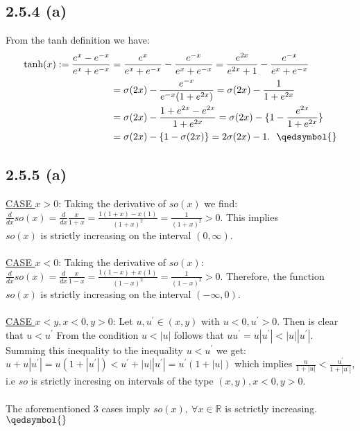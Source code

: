 \documentclass{exam}
\begin{document}
\subsection*{2.5.4 (a)}
From the tanh definition we have:
\begin{equation*}
    \begin{aligned}
        \text{tanh}(x):= \frac{e^{x} - e^{-x}}{e^{x} + e^{-x}} &= \frac{e^x}{e^{x} + e^{-x}} - \frac{e^{-x}}{e^{x} + e^{-x}} = \frac{e^{2x}}{e^{2x} + 1} - \frac{e^{-x}}{e^{x} + e^{-x}} \\
        &= \sigma(2x) - \frac{e^{-x}}{e^{-x}(1 + e^{2x})} = \sigma(2x) - \frac{1}{1 + e^{2x}} \\
        &= \sigma(2x) - \frac{1 + e^{2x} - e^{2x}}{1 + e^{2x}} = \sigma(2x) - \{1 - \frac{e^{2x}}{1 + e^{2x}} \}\\
        &= \sigma(2x) - \{1 - \sigma(2x)\} = 2\sigma(2x) - 1\text{.\ \ $\qedsymbol{}$}
    \end{aligned}    
\end{equation*}

\subsection*{2.5.5 (a)}
\underline{CASE $x > 0$}:\newline
Taking the derivative of $so(x)$ we find: $\frac{d}{d x} so(x) = \frac{d}{d x} \frac{x}{1 + x} =  \frac{1(1 + x) - x(1)}{(1 + x)^{2}} = \frac{1}{(1 + x)^{2}} > 0$. 
This implies \\ $so(x)$ is strictly increasing on the interval $(0,\infty)$.\\
\\
\underline{CASE $x < 0$}:\newline
Taking the derivative of $so(x)$: $\frac{d}{d x} so(x) = \frac{d}{d x} \frac{x}{1 - x} =  \frac{1(1 - x) + x(1)}{(1 - x)^{2}} = \frac{1}{(1 - x)^{2}} > 0$. 
Therefore, the function\\ $so(x)$ is strictly increasing on the interval $(-\infty,0)$.\\
\\
\underline{CASE $x < y, x < 0, y > 0 $}: \newline
Let $u, u^{\prime} \in (x,y)$ with $u < 0, u^{\prime} > 0$. Then is clear that $u < u^{\prime}$ From the condition $u < |u|$ follows that $u u^{\prime} = u |u^{\prime}| < |u||u^{\prime}|$. Summing this inequality to the inequality $u < u^{\prime}$ we get:
$u + u|u^{\prime}| = u(1 + |u^{\prime}|) < u^{\prime} + |u||u^{\prime}| = u^{\prime}(1 + |u|)$ which implies $\frac{u}{1 + |u|} < \frac{u^{\prime}}{ 1 + |u^{\prime}|}$, i.e  $so$ is strictly incresing on intervals of the 
type $(x,y), x < 0, y > 0$.\\
\\
The aforementioned 3 cases imply $so(x), \ \forall x \in \mathbb{R}$ is sctrictly increasing. \ $\qedsymbol{}$
\end{document}
